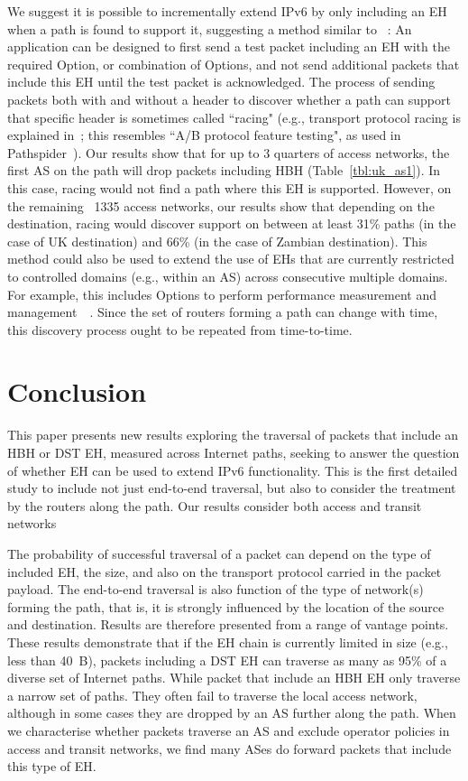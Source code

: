 \documentclass[conference]{IEEEtran}
\begin{document}
We suggest it is possible to incrementally extend IPv6 by only including an EH when a path is found to support it,
suggesting a method similar to ~\cite{rfc9268}:
An application can be designed to first send a test packet including an EH with the required Option, or combination of Options, and not send additional packets that include this EH until the test packet is acknowledged. The process of sending packets both with and without a header to discover whether a path can support that specific header is sometimes called ``racing" (e.g., transport protocol racing is explained in~\cite{ietf-taps-arch-18}; this resembles ``A/B protocol feature testing", as used in Pathspider~\cite{learmonth2016pathspider}). Our results show that for up to 3 quarters of access networks, the first AS on the path will drop packets including HBH (Table~\ref{tbl:uk_as1}). In this case, racing would not find a path where this EH is supported. However, on the remaining ~1335 access networks, our results show that depending on the destination, racing would discover support on between at least 31\% paths (in the case of UK destination) and 66\% (in the case of Zambian destination).
This method could also be used to extend the use of EHs that are currently restricted to controlled domains (e.g., within an AS) across consecutive multiple domains. For example, this includes Options to perform performance measurement and management~\cite{rfc8250}~\cite{ietf-ippm-ioam-ipv6-options-10}.
Since the set of routers forming a path can change with time, this discovery process ought to be repeated from time-to-time. 

 
\section{Conclusion}
\label{sec:conclusion}

This paper presents new results exploring the traversal of packets that include an HBH or DST EH, measured across Internet paths, seeking to answer the question of whether EH can be used to extend IPv6 functionality. This is the first detailed study to include not just end-to-end traversal, but also to consider the treatment by the routers along the path. Our results consider both access and transit networks

The probability of successful traversal of a packet can depend on the type of included EH, the size, and also on the transport protocol carried in the packet payload. The end-to-end traversal is also function of the type of network(s) forming the path, that is, it is strongly influenced by the location of the source and destination. Results are therefore presented from a range of vantage points.
These results demonstrate that if the EH chain is currently limited in size (e.g., less than 40~B), packets including a DST EH can traverse as many as
95\% of a diverse set of Internet paths. While packet that include an HBH EH only traverse a narrow set of paths. They often fail to traverse the local access network, although in some cases they are dropped by an AS further along the path. When we characterise whether packets traverse an AS and exclude operator policies in access and transit networks, we find many ASes do forward packets that include this type of EH.
\end{document}
